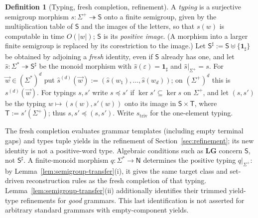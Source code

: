 \documentclass[11pt]{article}
\numberwithin{equation}{section}
\theoremstyle{plain}
\theoremstyle{definition}
\newtheorem{definition}[theorem]{Definition}
\theoremstyle{remark}
\newcommand{\tuple}[1]{\vec{#1}}
\newcommand{\eps}{\varepsilon}
\begin{document}
\begin{definition}[Typing, fresh completion, refinement]
\label{def-monoid-morphism}
\label{def:semigroup-typing}
\label{def:h-refinement}
A \emph{typing} is a surjective semigroup morphism
$s:\Sigma^+\twoheadrightarrow\mathsf S$ onto a finite semigroup, given by the
multiplication table of $\mathsf S$ and the images of the letters, so that
$s(w)$ is computable in time $O(|w|)$; $\mathsf S$ is its \emph{positive
image}.  (A morphism into a larger finite semigroup is replaced by its
corestriction to the image.)  Let $\mathsf S^\sharp:=\mathsf
S\uplus\{\mathbf1_\sharp\}$ be obtained by adjoining a \emph{fresh} identity,
even if $\mathsf S$ already has one, and let
$\widehat{s}:\Sigma^*\twoheadrightarrow\mathsf S^\sharp$ be the monoid morphism
with $\widehat{s}(\eps)=\mathbf1_\sharp$ and $\widehat{s}|_{\Sigma^+}=s$.  For
$\tuple w\in(\Sigma^*)^d$ put
$\widehat{s}^{(d)}(\tuple w):=(\widehat{s}(w_1),\ldots,\widehat{s}(w_d))$; on
$(\Sigma^+)^d$ this is $s^{(d)}(\tuple w)$.  For typings $s,s'$ write $s\preceq
s'$ if $\ker s'\subseteq\ker s$ on $\Sigma^+$, and let $(s,s')$ be the typing
$w\mapsto(s(w),s'(w))$ onto its image in $\mathsf S\times\mathsf T$, where $\mathsf T:=s'(\Sigma^+)$; thus
$s,s'\preceq(s,s')$.  Write $s_{\mathrm{triv}}$ for the one-element typing.
\end{definition}

The fresh completion evaluates grammar templates (including empty
terminal gaps) and types tuple yields in the refinement of
Section~\ref{sec:refinement}; its new identity is not a positive-word type.
Algebraic conditions such as $\mathbf{LG}$ concern $\mathsf S$, not
$\mathsf S^\sharp$.  A finite-monoid morphism $q:\Sigma^*\to\mathsf N$ determines
the positive typing $q|_{\Sigma^+}$: by
Lemma~\ref{lem:semigroup-transfer}(i), it gives the same target class and
set-driven reconstruction rules as the fresh completion of that typing.
Lemma~\ref{lem:semigroup-transfer}(ii) additionally identifies their
trimmed yield-type refinements for \emph{good} grammars.  This last
identification is not asserted for arbitrary standard grammars with
empty-component yields.
\end{document}
